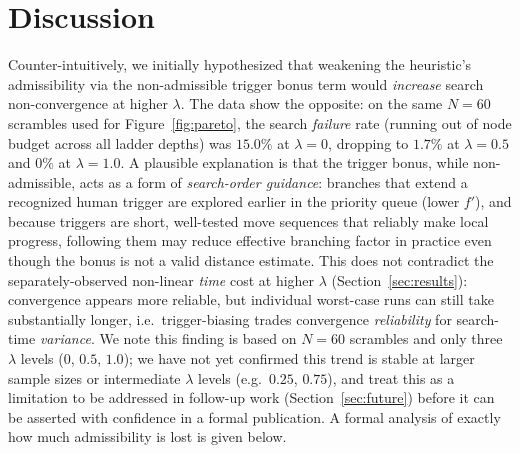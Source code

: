 \documentclass[10pt,conference]{article}
\begin{document}
\section{Discussion}
\label{sec:discussion}
Counter-intuitively, we initially hypothesized that weakening the
heuristic's admissibility via the non-admissible trigger bonus term
would \emph{increase} search non-convergence at higher $\lambda$.
The data show the opposite: on the same $N=60$ scrambles used for
Figure~\ref{fig:pareto}, the search \emph{failure} rate (running out
of node budget across all ladder depths) was $15.0\%$ at
$\lambda=0$, dropping to $1.7\%$ at $\lambda=0.5$ and $0\%$ at
$\lambda=1.0$. A plausible explanation is that the trigger bonus,
while non-admissible, acts as a form of \emph{search-order
guidance}: branches that extend a recognized human trigger are
explored earlier in the priority queue (lower $f'$), and because
triggers are short, well-tested move sequences that reliably make
local progress, following them may reduce effective branching factor
in practice even though the bonus is not a valid distance estimate.
This does not contradict the separately-observed non-linear
\emph{time} cost at higher $\lambda$ (Section~\ref{sec:results}):
convergence appears more reliable, but individual worst-case runs
can still take substantially longer, i.e.\ trigger-biasing trades
convergence \emph{reliability} for search-time \emph{variance}.
We note this finding is based on $N=60$ scrambles and only three
$\lambda$ levels ($0$, $0.5$, $1.0$); we have not yet confirmed this
trend is stable at larger sample sizes or intermediate $\lambda$
levels (e.g.\ $0.25$, $0.75$), and treat this as a limitation to be
addressed in follow-up work (Section~\ref{sec:future}) before it can
be asserted with confidence in a formal publication. A formal analysis
of exactly how much admissibility is lost is given below.
\end{document}
